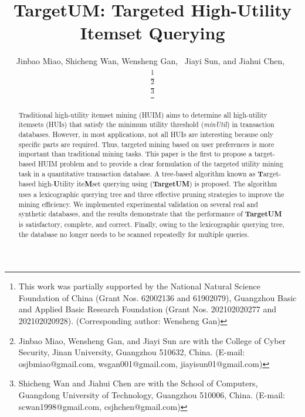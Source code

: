 \documentclass[journal]{IEEEtran}
\begin{document}

\title{TargetUM: Targeted High-Utility Itemset Querying}



\author{Jinbao Miao, Shicheng Wan, Wensheng Gan,~ Jiayi Sun, and Jiahui Chen,~  
	

	\thanks{This work was partially supported by the National Natural Science Foundation of China (Grant Nos. 62002136 and 61902079), Guangzhou Basic and Applied Basic Research Foundation (Grant Nos. 202102020277 and 202102020928). (Corresponding author: Wensheng Gan)}

	
	\thanks{Jinbao Miao, Wensheng Gan, and Jiayi Sun are with the College of Cyber Security, Jinan University, Guangzhou 510632, China. (E-mail: osjbmiao@gmail.com, wsgan001@gmail.com, jiayisun01@gmail.com)}
	
	\thanks{Shicheng Wan and Jiahui Chen are with the School of Computers, Guangdong University of Technology, Guangzhou 510006, China. (E-mail: scwan1998@gmail.com, csjhchen@gmail.com)} 
}





\maketitle


\begin{abstract}

Traditional high-utility itemset mining (HUIM) aims to determine all high-utility itemsets (HUIs) that satisfy the minimum utility threshold (\textit{minUtil}) in transaction databases. However, in most applications, not all HUIs are interesting because only specific parts are required. Thus, targeted mining based on user preferences is more important than traditional mining tasks. This paper is the first to propose a target-based HUIM problem and to provide a clear formulation of the targeted utility mining task in a quantitative transaction database. A tree-based algorithm known as \textbf{T}arget-based high-\textbf{U}tility ite\textbf{M}set querying using (\textbf{TargetUM}) is proposed. The algorithm uses a lexicographic querying tree and three effective pruning strategies to improve the mining efficiency. We implemented experimental validation on several real and synthetic databases, and the results demonstrate that the performance of \textbf{TargetUM} is satisfactory, complete, and correct. Finally, owing to the lexicographic querying tree, the database no longer needs to be scanned repeatedly for multiple queries.
\end{abstract}
\end{document}
